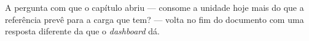 A pergunta com que o capítulo abriu --- consome a unidade hoje mais do
que a referência prevê para a carga que tem? --- volta no fim do
documento com uma resposta diferente da que o \emph{dashboard} dá.
